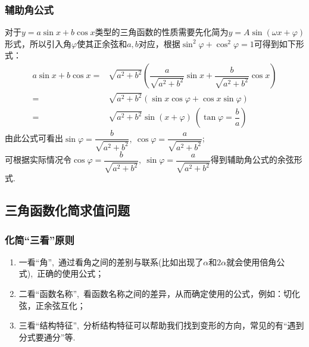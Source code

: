 \documentclass{BHCexam}
\begin{document}
{\subsubsection{辅助角公式}
对于$ y=a\sin x+b\cos x $类型的三角函数的性质需要先化简为$y=A\sin\left(\omega x+\varphi\right)$形式，所以引入角$ \varphi $使其正余弦和$ a,b $对应，根据$ \sin^2\varphi+\cos^2\varphi=1 $可得到如下形式：
\begin{equation*}\begin{aligned}
a\sin x+b\cos x=&\sqrt{a^2+b^2}\left(\dfrac{a}{\sqrt{a^2+b^2}}\sin x+\dfrac{b}{\sqrt{a^2+b^2}}\cos x\right)\\
=&\sqrt{a^2+b^2}\left(\sin x\cos \varphi+\cos x\sin\varphi\right)\\
=&\sqrt{a^2+b^2}\sin\left(x+\varphi\right)~\left(\tan\varphi=\dfrac{b}{a}\right)
\end{aligned}
\end{equation*}
由此公式可看出$ \sin\varphi=\dfrac{b}{\sqrt{a^2+b^2}},~\cos\varphi=\dfrac{a}{\sqrt{a^2+b^2}} $;\\
可根据实际情况令$  \cos\varphi=\dfrac{b}{\sqrt{a^2+b^2}},~\sin\varphi=\dfrac{a}{\sqrt{a^2+b^2}} $得到辅助角公式的余弦形式.
\subsection{三角函数化简求值问题}
\subsubsection{化简“三看”原则}
\begin{enumerate}[(1)]
\item 一看“角”,~通过看角之间的差别与联系(比如出现了$ \alpha $和$ 2\alpha $就会使用倍角公式),~正确的使用公式；
\item 二看“函数名称”,~看函数名称之间的差异，从而确定使用的公式，例如：切化弦，正余弦互化；
\item 三看“结构特征”,~分析结构特征可以帮助我们找到变形的方向，常见的有“遇到分式要通分”等.
\end{enumerate}
}
\end{document}

